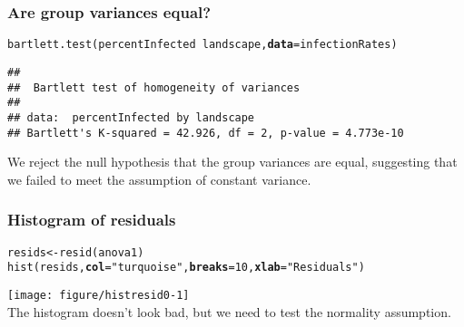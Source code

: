 \documentclass[color=usenames,dvipsnames]{beamer}\usepackage[]{graphicx}\usepackage[]{color}
\makeatletter
\newcommand{\hlnum}[1]{\textcolor[rgb]{0.69,0.494,0}{#1}}%
\newcommand{\hlstr}[1]{\textcolor[rgb]{0.749,0.012,0.012}{#1}}%
\newcommand{\hlopt}[1]{\textcolor[rgb]{0,0,0}{#1}}%
\newcommand{\hlstd}[1]{\textcolor[rgb]{0,0,0}{#1}}%
\newcommand{\hlkwb}[1]{\textcolor[rgb]{0,0.341,0.682}{#1}}%
\newcommand{\hlkwc}[1]{\textcolor[rgb]{0,0,0}{\textbf{#1}}}%
\newcommand{\hlkwd}[1]{\textcolor[rgb]{0.004,0.004,0.506}{#1}}%
\newenvironment{kframe}{%
 \def\at@end@of@kframe{}%
 \ifinner\ifhmode%
  \def\at@end@of@kframe{\end{minipage}}%
  \begin{minipage}{\columnwidth}%
 \fi\fi%
 \def\FrameCommand##1{\hskip\@totalleftmargin \hskip-\fboxsep
 \colorbox{shadecolor}{##1}\hskip-\fboxsep
     \hskip-\linewidth \hskip-\@totalleftmargin \hskip\columnwidth}%
 \MakeFramed {\advance\hsize-\width
   \@totalleftmargin\z@ \linewidth\hsize
   \@setminipage}}%
 {\par\unskip\endMakeFramed%
 \at@end@of@kframe}
\newenvironment{knitrout}{}{} %
\makeatother
\begin{document}
\begin{frame}[fragile]
  \frametitle{Are group variances equal?}
  \small
\begin{knitrout}\footnotesize
{}\color{fgcolor}\begin{kframe}
\begin{alltt}
\hlkwd{bartlett.test}\hlstd{(percentInfected}\hlopt{~}\hlstd{landscape,} \hlkwc{data}\hlstd{=infectionRates)}
\end{alltt}
\begin{verbatim}
## 
## 	Bartlett test of homogeneity of variances
## 
## data:  percentInfected by landscape
## Bartlett's K-squared = 42.926, df = 2, p-value = 4.773e-10
\end{verbatim}
\end{kframe}
\end{knitrout}
\vfill
{We reject the null hypothesis that the group variances are equal,
  suggesting that we failed to meet the assumption of constant variance.}
\end{frame}






\begin{frame}[fragile]
  \frametitle{Histogram of residuals}
\scriptsize
\begin{knitrout}
\color{fgcolor}\begin{kframe}
\begin{alltt}
\hlstd{resids} \hlkwb{<-} \hlkwd{resid}\hlstd{(anova1)}
\hlkwd{hist}\hlstd{(resids,} \hlkwc{col}\hlstd{=}\hlstr{"turquoise"}\hlstd{,} \hlkwc{breaks}\hlstd{=}\hlnum{10}\hlstd{,} \hlkwc{xlab}\hlstd{=}\hlstr{"Residuals"}\hlstd{)}
\end{alltt}
\end{kframe}
\end{knitrout}
\centering
\texttt{[image: figure/histresid0-1]} \\
\vfill
The histogram doesn't look bad, but we need to test the normality
assumption.
\end{frame}
\end{document}

